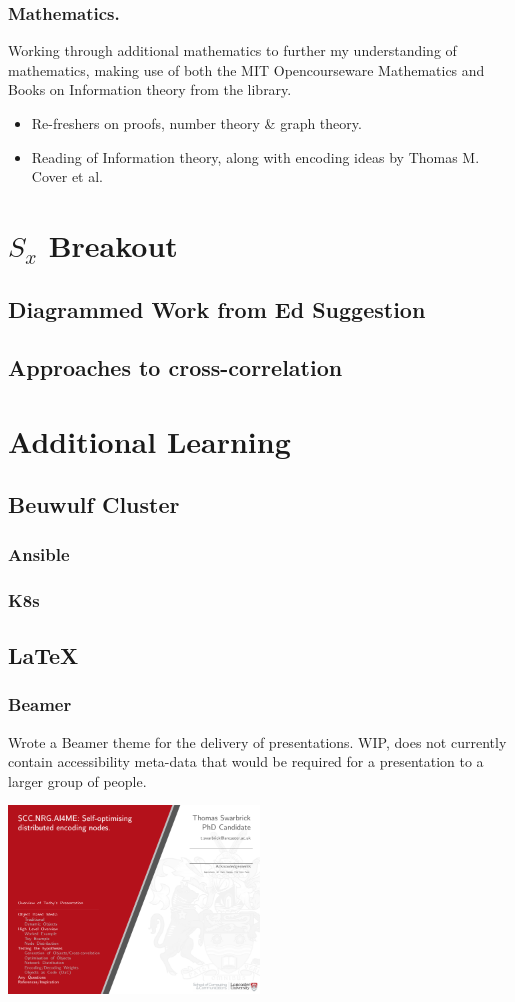 \documentclass[]{scrreprt}
\begin{document}
\subsection{Mathematics.}
Working through additional mathematics to further my understanding of mathematics, making use of both the MIT Opencourseware Mathematics and Books on Information theory from the library.
\begin{itemize}
  \item Re-freshers on proofs, number theory \& graph theory.
  \item Reading of Information theory, along with encoding ideas by Thomas M. Cover et al.
\end{itemize}


\chapter{$S_{x}$ Breakout }
\section{Diagrammed Work from Ed Suggestion}
\section{Approaches  to cross-correlation}

\chapter{Additional Learning}
\section{Beuwulf Cluster}
\subsection{Ansible}
\subsection{K8s}
\section{\LaTeX}
\subsection{Beamer}
Wrote a Beamer theme for the delivery of presentations. WIP, does not currently contain accessibility meta-data that would be required for a presentation to a larger group of people.
\begin{center}
  \includegraphics[width=0.5\textwidth]{example.pdf}
\end{center}
\end{document}
